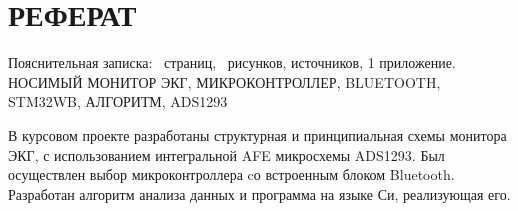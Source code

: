 \begin{sloppypar} %
\newpage %
\section*{РЕФЕРАТ} %

Пояснительная записка: \pageref*{LastPage}~страниц, \totfig~рисунков, источников, 1 приложение.\\

НОСИМЫЙ МОНИТОР ЭКГ, МИКРОКОНТРОЛЛЕР, BLUETOOTH, STM32WB, АЛГОРИТМ, ADS1293



В курсовом проекте разработаны структурная и принципиальная схемы монитора ЭКГ, с использованием интегральной AFE микросхемы ADS1293. Был осуществлен выбор микроконтроллера cо встроенным блоком Bluetooth. Разработан алгоритм анализа данных и программа на языке Си, реализующая его.

\end{sloppypar}
